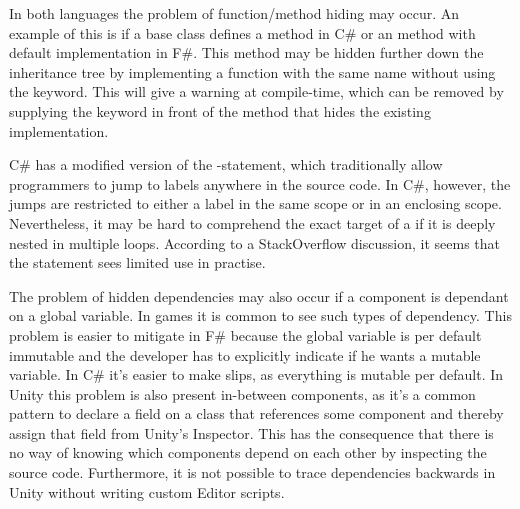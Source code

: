 In both languages the problem of function/method hiding may occur. An example of this is if a base class defines a  method in C\# or an  method with default implementation in F\#. This method may be hidden further down the inheritance tree by implementing a function with the same name without using the  keyword. This will give a warning at compile-time, which can be removed by supplying the  keyword in front of the method that hides the existing implementation.

C\# has a modified version of the -statement, which traditionally allow programmers to jump to labels anywhere in the source code. In C\#, however, the jumps are restricted to either a label in the same scope or in an enclosing scope\cite{csharp:goto}. Nevertheless, it may be hard to comprehend the exact target of a  if it is deeply nested in multiple loops. According to a StackOverflow discussion\cite{goto:stack:overflow}, it seems that the  statement sees limited use in practise.

The problem of hidden dependencies may also occur if a component is dependant on a global variable. In games it is common to see such types of dependency\cite{blow2004game, guana2015building, nystrom2014game}. This problem is easier to mitigate in F\# because the global variable is per default immutable and the developer has to explicitly indicate if he wants a mutable variable. In C\# it's easier to make slips, as everything is mutable per default. In Unity this problem is also present in-between components, as it's a common pattern to declare a field on a class that references some component and thereby assign that field from Unity's Inspector\cite{unity:inspector:assignment}. This has the consequence that there is no way of knowing which components depend on each other by inspecting the source code. Furthermore, it is not possible to trace dependencies backwards in Unity without writing custom Editor scripts\cite{unity:dependencies:backwards}.